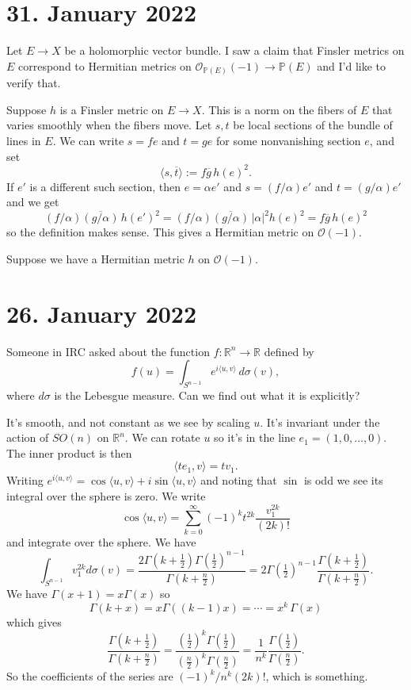 \documentclass[11pt]{article}
\theoremstyle{definition}
\newcommand{\kk}[1]{\mathbb{#1}}
\newcommand{\cc}[1]{\mathcal{#1}}
\def\ov#1{\overline{#1}}
\begin{document}
\section*{31. January 2022}

Let $E \to X$ be a holomorphic vector bundle. I saw a claim that Finsler metrics
on $E$ correspond to Hermitian metrics on $\cc O_{\kk P(E)}(-1) \to \kk P(E)$ and I'd like
to verify that.

Suppose $h$ is a Finsler metric on $E \to X$. This is a norm on the fibers of
$E$ that varies smoothly when the fibers move. Let $s,t$ be local sections of
the bundle of lines in $E$. We can write $s = fe$ and $t = ge$ for some
nonvanishing section $e$, and set
$$
\langle s, \ov t \rangle
:= f \ov g \, h(e)^2.
$$
If $e'$ is a different such section, then $e = \alpha e'$ and $s = (f/ \alpha)
e'$ and $t = (g/\alpha)e'$ and we get
$$
(f/\alpha) \ov{(g/\alpha)} \, h(e')^2
= (f/\alpha) \ov{(g/\alpha)} \, |\alpha|^2 h(e)^2
= f \ov{g} \, h(e)^2
$$
so the definition makes sense. This gives a Hermitian metric on $\cc O(-1)$.

Suppose we have a Hermitian metric $h$ on $\cc O(-1)$.

\section*{26. January 2022}

Someone in IRC asked about the function $f: \kk R^n \to \kk R$ defined by
$$
f(u)
= \int_{S^{n-1}} e^{i \langle u, v \rangle}\, d\sigma(v),
$$
where $d\sigma$ is the Lebesgue measure. Can we find out what it is explicitly?

It's smooth, and not constant as we see by scaling $u$. It's invariant under the
action of $SO(n)$ on $\kk R^n$. We can rotate $u$ so it's in the line
$e_1 = (1,0,\ldots,0)$. The inner product is then
$$
\langle t e_1, v \rangle
= t v_1.
$$
Writing $e^{i\langle u, v \rangle} = \cos\langle u, v \rangle + i \sin\langle u,
v \rangle$ and noting that $\sin$ is odd we see its integral over the sphere is
zero. We write
$$
\cos\langle u, v \rangle
= \sum_{k = 0}^\infty (-1)^k t^{2k} \frac{v_1^{2k}}{(2k)!}
$$
and integrate over the sphere. We have
$$
\int_{S^{n-1}} v_1^{2k} d\sigma(v)
= \frac{2\Gamma(k + \frac12)\Gamma(\frac12)^{n-1}}{\Gamma(k+\frac n2)}
= 2\Gamma(\tfrac12)^{n-1} \frac{\Gamma(k + \frac12)}{\Gamma(k+\frac n2)}.
$$
We have
$
\Gamma(x + 1) = x \Gamma(x)
$
so
$$
\Gamma(k+x)
= x \Gamma((k-1) x)
= \cdots
= x^k \, \Gamma(x)
$$
which gives
$$
\frac{\Gamma(k + \frac12)}{\Gamma(k+\frac n2)}
= \frac{(\frac12)^k\Gamma(\frac12)}{(\frac n2)^k\Gamma(\frac n2)}
= \frac{1}{n^k} \frac{\Gamma(\frac12)}{\Gamma(\frac n2)}.
$$
So the coefficients of the series are $(-1)^k /n^k (2k)!$, which is something.
\end{document}

